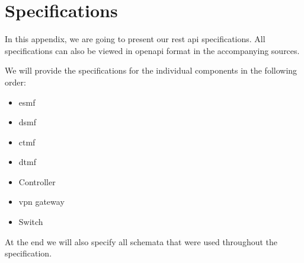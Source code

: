 \chapter{Specifications}
\label{specifications}

In this appendix, we are going to present our \acrshort{rest} \acrshort{api} specifications. All specifications can also be viewed in \Gls{openapi} format in the accompanying sources.

We will provide the specifications for the individual components in the following order:

\begin{itemize}
    \item \acrshort{esmf}
    \item \acrshort{dsmf}
    \item \acrshort{ctmf}
    \item \acrshort{dtmf}
    \item Controller
    \item \acrshort{vpn} gateway
    \item Switch
\end{itemize}

At the end we will also specify all schemata that were used throughout the specification.

%
%
%
%
%
%
%